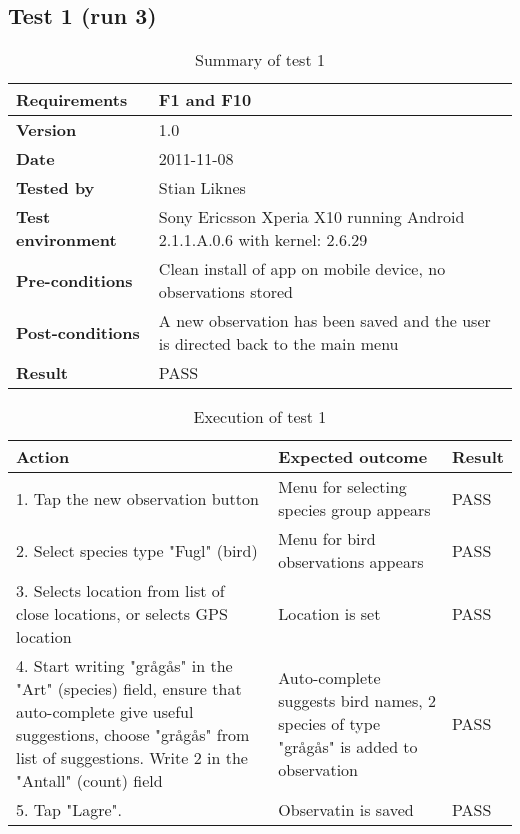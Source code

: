 \newpage
\subsection*{Test 1 (run 3)}

	\begin{table}[htb]
		\centering
		\begin{tabular}{|p{3.5cm}|p{7.0cm}|} \hline
			\textbf{Requirements} & F1 and F10 \\ \hline
			\textbf{Version} & 1.0 \\ \hline
			\textbf{Date} & 2011-11-08 \\ \hline
			\textbf{Tested by} & Stian Liknes \\ \hline
			\textbf{Test environment} & Sony Ericsson Xperia X10 running Android 2.1.1.A.0.6 with kernel: 2.6.29 \\ \hline
			\textbf{Pre-conditions} & Clean install of app on mobile device, no observations stored \\ \hline
			\textbf{Post-conditions} & A new observation has been saved and the user is directed back to the main menu \\ \hline
			\textbf{Result} & PASS \\ \hline
		\end{tabular}
		\caption{Summary of test 1}
	\end{table}

	\begin{table}[htb]
		\centering
		\begin{tabular}{|p{5.0cm}|p{5.0cm}|p{1cm}|}
			\hline \textbf{Action} & \textbf{Expected outcome} & \textbf{Result} \\ \hline
			1. Tap the new observation button & Menu for selecting species group appears & PASS \\ \hline
			2. Select species type "Fugl" (bird) & Menu for bird observations appears & PASS \\ \hline
			3. Selects location from list of close locations, or selects GPS location & Location is set & PASS \\ \hline
			4. Start writing "grågås" in the "Art" (species) field, ensure that
			auto-complete give useful suggestions, choose "grågås" from list of
			suggestions. Write 2 in the "Antall" (count) field & Auto-complete
			suggests bird names, 2 species of type "grågås" is added to observation
			& PASS \\ \hline 
			5. Tap "Lagre". & Observatin is saved & PASS \\ \hline
		\end{tabular}
		\caption{Execution of test 1}
	\end{table}

